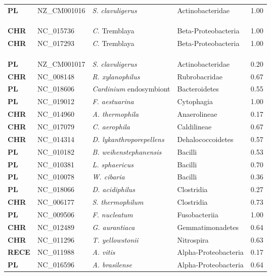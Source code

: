\begin{adjustwidth}{-3cm}{2cm}
{\begin{supertabular}{>{\bfseries}l|p{0.1\textwidth}p{0.14\textwidth}l|l}
PL & NZ\_CM001016 & \textit{S. clavuligerus} & Actinobacteridae & 1.00\\
\\
\\
\hline\\
CHR & NC\_015736 & \textit{C.} Tremblaya & Beta-Proteobacteria & 1.00\\
CHR & NC\_017293 & \textit{C.} Tremblaya & Beta-Proteobacteria & 1.00\\
\\
\\
\hline\\
PL & NZ\_CM001017 & \textit{S. clavuligerus} & Actinobacteridae & 0.20\\
CHR & NC\_008148 & \textit{R. xylanophilus} & Rubrobacridae & 0.67\\
PL & NC\_018606 & \textit{Cardinium }endosymbiont & Bacteroidetes & 0.55\\
PL & NC\_019012 & \textit{F. aestuarina} & Cytophagia & 1.00\\
CHR & NC\_014960 & \textit{A. thermophila} & Anaerolineae & 0.17\\
CHR & NC\_017079 & \textit{C. aerophila} & Caldilineae & 0.67\\
CHR & NC\_014314 & \textit{D. lykanthroporepellens} & Dehalococcoidetes & 0.57\\
PL & NC\_010182 & \textit{B. weihenstephanensis} & Bacilli & 0.53\\
PL & NC\_010381 & \textit{L. sphaericus} & Bacilli & 0.70\\
PL & NC\_010078 & \textit{W. cibaria} & Bacilli & 0.36\\
PL & NC\_018066 & \textit{D. acidiphilus} & Clostridia & 0.27\\
CHR & NC\_006177 & \textit{S. thermophilum} & Clostridia & 0.73\\
PL & NC\_009506 & \textit{F. nucleatum} & Fusobacteriia & 1.00\\
CHR & NC\_012489 & \textit{G. aurantiaca} & Gemmatimonadetes & 0.64\\
CHR & NC\_011296 & \textit{T. yellowstonii} & Nitrospira & 0.63\\
RECE & NC\_011988 & \textit{A. vitis} & Alpha-Proteobacteria & 0.17\\
PL & NC\_016596 & \textit{A. brasilense} & Alpha-Proteobacteria & 0.64\\

\end{supertabular}}
\end{adjustwidth}
